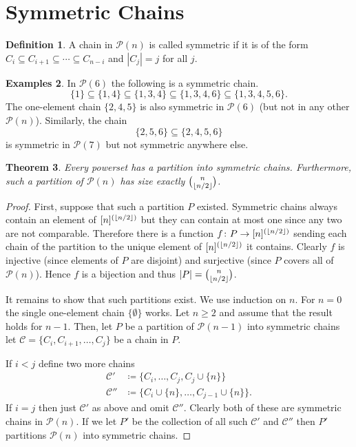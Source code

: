 \documentclass{report}
\DeclarePairedDelimiter\floor{\lfloor}{\rfloor}
\theoremstyle{definition}
\theoremstyle{plain}
\newtheorem{thm}{Theorem}[section]
\theoremstyle{definition}
\newtheorem{defn}[thm]{Definition}
\newtheorem{egs}[thm]{Examples}
\begin{document}
 	\section{Symmetric Chains}
 	\begin{defn}
 		A chain in $\mathcal{P}(n)$ is called symmetric if it is of the form $C_i \subseteq C_{i+1} \subseteq \cdots \subseteq C_{n-i}$ and $|C_j| = j$ for all $j$.
 	\end{defn}
 	\begin{egs}
 		In $\mathcal{P}(6)$ the following is a symmetric chain.
 		\[
 			\{1\} \subseteq \{1,4\}\subseteq \{1,3,4\}\subseteq \{1,3,4,6\}\subseteq \{1,3,4,5,6\}.
 		\]
 		The one-element chain $\{2,4,5\}$ is also symmetric in $\mathcal{P}(6)$ (but not in any other $\mathcal{P}(n)$). Similarly, the chain
 		\[
 			\{2,5,6\} \subseteq \{2,4,5,6\}
 		\]
 		is symmetric in $\mathcal{P}(7)$ but not symmetric anywhere else.
 	\end{egs}
 	\begin{thm}\label{thm:dsc}
 		Every powerset has a partition into symmetric chains. Furthermore, such a partition of $\mathcal{P}(n)$ has size exactly $\binom{n}{\floor{n/2}}$.
 	\end{thm}
 	\begin{proof}
 		First, suppose that such a partition $P$ existed. Symmetric chains always contain an element of $[n]^{(\floor{n/2})}$ but they can contain at most one since any two are not comparable. Therefore there is a function $f\colon P \to [n]^{(\floor{n/2})}$ sending each chain of the partition to the unique element of $[n]^{(\floor{n/2})}$ it contains. Clearly $f$ is injective (since elements of $P$ are disjoint) and surjective (since $P$ covers all of $\mathcal{P}(n)$). Hence $f$ is a bijection and thus $|P| = \binom{n}{\floor{n/2}}$.		
 		
 		
 		It remains to show that such partitions exist. We use induction on $n$. For $n = 0$ the single one-element chain $\{\emptyset\}$ works. Let $n\geq 2$ and assume that the result holds for $n-1$. Then, let $P$ be a partition of $\mathcal{P}(n-1)$ into symmetric chains let $\mathcal{C} = \{C_i,C_{i+1},\ldots, C_{j}\}$ be a chain in $P$.
 		
 		If $i<j$ define two more chains
 		\begin{align*}
 			\mathcal{C}'&\coloneqq \{C_i,\ldots,C_j,C_j \cup \{n\}\}\\
 			\mathcal{C}''&\coloneqq \{C_i\cup\{n\},\ldots, C_{j-1}\cup\{n\}\}.
 		\end{align*}
 		If $i=j$ then just $\mathcal{C'}$ as above and omit $\mathcal{C''}$. Clearly both of these are symmetric chains in $\mathcal{P}(n)$. If we let $P'$ be the collection of all such $\mathcal{C}'$ and $\mathcal{C}''$ then $P'$ partitions $\mathcal{P}(n)$ into symmetric chains.
 	\end{proof}
\end{document}

